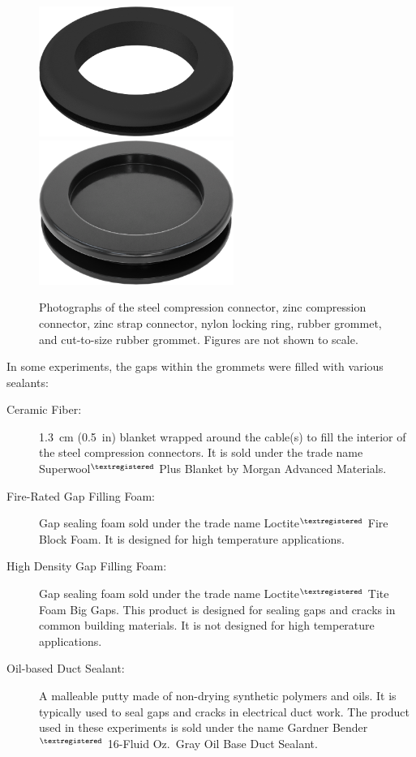 \begin{figure}[p]
\hfill \\
\hfill \\
\includegraphics[width=2.5in]{../FIGURES/Rubber_Grommet} \hfill
\includegraphics[width=2.5in]{../FIGURES/Solid_Rubber_Grommet}
\caption[Photographs of the various grommets]{Photographs of the steel compression connector, zinc compression connector, zinc strap connector, nylon locking ring, rubber grommet, and cut-to-size rubber grommet. Figures are not shown to scale.}
\label{grommet_photo}
\end{figure}


In some experiments, the gaps within the grommets were filled with various sealants:
\begin{description}
\item[Ceramic Fiber:] 1.3~cm (0.5~in) blanket wrapped around the cable(s) to fill the interior of the steel compression connectors. It is sold under the trade name Superwool$^{\textregistered}$ Plus Blanket by Morgan Advanced Materials.
\item[Fire-Rated Gap Filling Foam:] Gap sealing foam sold under the trade name Loctite$^{\textregistered}$ Fire Block Foam. It is designed for high temperature applications.
\item[High Density Gap Filling Foam:] Gap sealing foam sold under the trade name Loctite$^{\textregistered}$ Tite Foam Big Gaps. This product is designed for sealing gaps and cracks in common building materials. It is not designed for high temperature applications.
\item[Oil-based Duct Sealant:] A malleable putty made of non-drying synthetic polymers and oils. It is typically used to seal gaps and cracks in electrical duct work. The product used in these experiments is sold under the name Gardner Bender$^{\textregistered}$ 16-Fluid Oz.~Gray Oil Base Duct Sealant.
\end{description}

